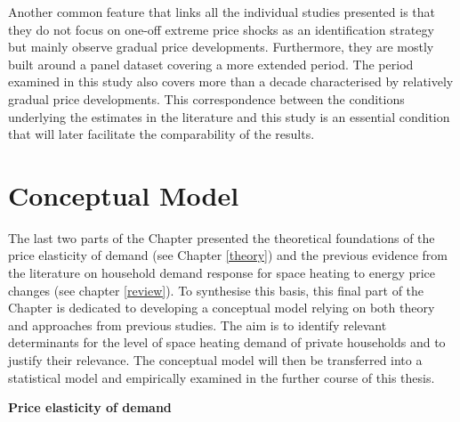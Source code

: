 \documentclass[12pt,twoside]{reedthesis}
\begin{document}
Another common feature that links all the individual studies presented is that they do not focus on one-off extreme price shocks as an identification strategy but mainly observe gradual price developments. Furthermore, they are mostly built around a panel dataset covering a more extended period. The period examined in this study also covers more than a decade characterised by relatively gradual price developments. This correspondence between the conditions underlying the estimates in the literature and this study is an essential condition that will later facilitate the comparability of the results.

\hypertarget{conceptual-model}{%
\section{Conceptual Model}\label{conceptual-model}}

The last two parts of the Chapter presented the theoretical foundations of the price elasticity of demand (see Chapter \ref{theory}) and the previous evidence from the literature on household demand response for space heating to energy price changes (see chapter \ref{review}). To synthesise this basis, this final part of the Chapter is dedicated to developing a conceptual model relying on both theory and approaches from previous studies. The aim is to identify relevant determinants for the level of space heating demand of private households and to justify their relevance. The conceptual model will then be transferred into a statistical model and empirically examined in the further course of this thesis.

\textbf{Price elasticity of demand}
\end{document}
